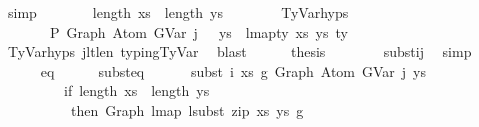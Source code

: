 \begin{isabellebody}
\ simp\isanewline
\isanewline
\ \ \ \ \isamarkupfalse%
\ \isamarkupfalse%
\ {\isachardoublequoteopen}length\ xs{\isacharprime}{\kern0pt}\ {\isacharequal}{\kern0pt}\ length\ ys{\isachardoublequoteclose}\isanewline
\ \ \ \ \ \ \isamarkupfalse%
\ TyVar{\isachardot}{\kern0pt}hyps{\isacharparenleft}{\kern0pt}{}{\isacharparenright}{\kern0pt}\ \isakeywordONE{{\isachardot}{\kern0pt}}\isamarkupfalse%
\isanewline
\isanewline
\ \ \ \ \isamarkupfalse%
\ \isamarkupfalse%
\isanewline
\ \ \ \ \ \ {\isachardoublequoteopen}{\isasymGamma}{}\ {\isasymturnstile}{\isacharbraceleft}{\kern0pt}P{\isacharbraceright}{\kern0pt}\ Graph\ {\isacharparenleft}{\kern0pt}Atom\ {\isacharparenleft}{\kern0pt}GVar\ {\isacharparenleft}{\kern0pt}j\ {\isacharminus}{\kern0pt}\ {}{\isacharparenright}{\kern0pt}{\isacharparenright}{\kern0pt}\ ys{\isacharparenright}{\kern0pt}\ {\isacharcolon}{\kern0pt}\ lmap{\isacharunderscore}{\kern0pt}ty\ xs{\isacharprime}{\kern0pt}\ ys\ ty{\isacharprime}{\kern0pt}{\isachardoublequoteclose}\isanewline
\ \ \ \ \ \isamarkupfalse%
\ TyVar{\isachardot}{\kern0pt}hyps{\isacharparenleft}{\kern0pt}{}{\isacharcomma}{\kern0pt}{}{\isacharcomma}{\kern0pt}{}{\isacharparenright}{\kern0pt}\ j{}{\isacharunderscore}{\kern0pt}lt{\isacharunderscore}{\kern0pt}len{\isacharunderscore}{\kern0pt}{\isasymGamma}{}\ typing{\isachardot}{\kern0pt}TyVar\ \isamarkupfalse%
\ blast\isanewline
\isanewline
\ \ \ \ \isamarkupfalse%
\ {\isacharquery}{\kern0pt}thesis\isanewline
\ \ \ \ \ \ \isamarkupfalse%
\ subst{\isacharunderscore}{\kern0pt}ij\ \isamarkupfalse%
\ simp\isanewline
\ \ \isamarkupfalse%
\isanewline
\ \ \ \ \isamarkupfalse%
\ eq\isanewline
\ \ \ \ \isamarkupfalse%
\ subst{\isacharunderscore}{\kern0pt}eq{\isacharcolon}{\kern0pt}\isanewline
\ \ \ \ \ \ {\isachardoublequoteopen}subst\ i\ xs\ g{}\ {\isacharparenleft}{\kern0pt}Graph\ {\isacharparenleft}{\kern0pt}Atom\ {\isacharparenleft}{\kern0pt}GVar\ j{\isacharparenright}{\kern0pt}\ ys{\isacharparenright}{\kern0pt}{\isacharparenright}{\kern0pt}\ {\isacharequal}{\kern0pt}\isanewline
\ \ \ \ \ \ \ \ \ {\isacharparenleft}{\kern0pt}if\ length\ xs\ {\isacharequal}{\kern0pt}\ length\ ys\isanewline
\ \ \ \ \ \ \ \ \ \ then\ Graph\ {\isacharparenleft}{\kern0pt}lmap\ {\isacharparenleft}{\kern0pt}lsubst\ {\isacharparenleft}{\kern0pt}zip\ xs\ ys{\isacharparenright}{\kern0pt}{\isacharparenright}{\kern0pt}\ g{}{\isacharparenright}{\kern0pt}\isanewline

\end{isabellebody}
